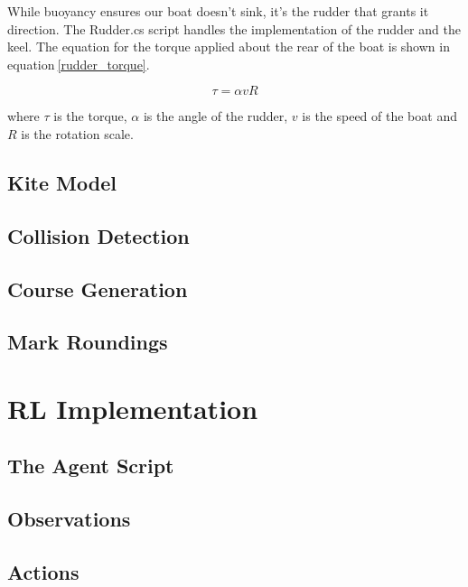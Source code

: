 While buoyancy ensures our boat doesn't sink, it's the rudder that grants it direction. The Rudder.cs script handles the implementation of the rudder and the keel. The equation for the torque applied about the rear of the boat is shown in equation$~$\ref{rudder_torque}. 

\begin{equation}
    \tau = \alpha v R
    \label{rudder_torque}
\end{equation}

where $\tau$ is the torque, $\alpha$ is the angle of the rudder, $v$ is the speed of the boat and $R$ is the rotation scale.

\subsection{Kite Model}

\subsection{Collision Detection}

\subsection{Course Generation}

\subsection{Mark Roundings}

\section{RL Implementation}\label{sec:RL_Implementation}

\subsection{The Agent Script}


\subsection{Observations}

\subsection{Actions}


